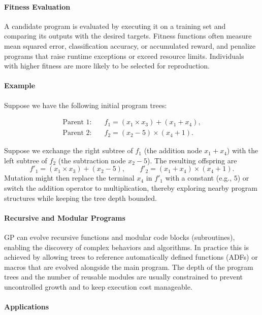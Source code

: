 \paragraph{Fitness Evaluation}

A candidate program is evaluated by executing it on a training set and comparing its outputs with the desired targets. Fitness functions often measure mean squared error, classification accuracy, or accumulated reward, and penalize programs that raise runtime exceptions or exceed resource limits. Individuals with higher fitness are more likely to be selected for reproduction.

\paragraph{Example}

Suppose we have the following initial program trees:

\[
\begin{aligned}
\text{Parent 1:}\quad & f_1 = (x_1 \times x_3) + (x_1 + x_4), \\
\text{Parent 2:}\quad & f_2 = (x_2 - 5) \times (x_4 + 1).
\end{aligned}
\]

Suppose we exchange the right subtree of $f_1$ (the addition node $x_1 + x_4$) with the left subtree of $f_2$ (the subtraction node $x_2 - 5$). The resulting offspring are
\[
f'_1 = (x_1 \times x_3) + (x_2 - 5), \qquad
f'_2 = (x_1 + x_4) \times (x_4 + 1).
\]
Mutation might then replace the terminal $x_4$ in $f'_1$ with a constant (e.g., $5$) or switch the addition operator to multiplication, thereby exploring nearby program structures while keeping the tree depth bounded.

\paragraph{Recursive and Modular Programs}

GP can evolve recursive functions and modular code blocks (subroutines), enabling the discovery of complex behaviors and algorithms. In practice this is achieved by allowing trees to reference automatically defined functions (ADFs) or macros that are evolved alongside the main program. The depth of the program trees and the number of reusable modules are usually constrained to prevent uncontrolled growth and to keep execution cost manageable.

\paragraph{Applications}

